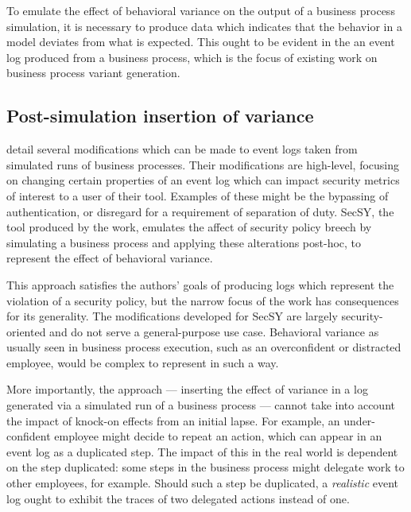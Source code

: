 \documentclass[draft,12pt]{llncs}  %
\begin{document}
To emulate the effect of behavioral variance on the output of a business process
simulation, it is necessary to produce data which indicates that the behavior in
a model deviates from what is expected. This ought to be evident in the an event
log produced from a business process, which is the focus of existing work on
business process variant generation.
\par

\subsection{Post-simulation insertion of variance}
\cite{accorsi2013secsy} detail several modifications which can be made to event
logs taken from simulated runs of business processes. Their modifications are
high-level, focusing on changing certain properties of an event log which can
impact security metrics of interest to a user of their tool. Examples of these 
might be the bypassing of authentication, or disregard for a requirement of
separation of duty. SecSY, the tool produced by the work, emulates the affect of
security policy breech by simulating a business process and applying these
alterations post-hoc, to represent the effect of behavioral variance.
\par

This approach satisfies the authors' goals of producing logs which represent the
violation of a security policy, but the narrow focus of the work has
consequences for its generality. The modifications developed for SecSY are
largely security-oriented and do not serve a general-purpose use case.
Behavioral variance as usually seen in business process execution, such as an
overconfident or distracted employee, would be complex to represent in such a
way.
\par

More importantly, the approach --- inserting the effect of variance in a log
generated via a simulated run of a business process --- cannot take into account
the impact of knock-on effects from an initial lapse. For example, an
under-confident employee might decide to repeat an action, which can appear in
an event log as a duplicated step. The impact of this in the real world is
dependent on the step duplicated: some steps in the business process might
delegate work to other employees, for example. Should such a step be duplicated,
a \emph{realistic} event log ought to exhibit the traces of two delegated
actions instead of one.
\par
\end{document}
